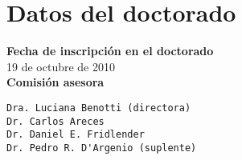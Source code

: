 \section{Datos del doctorado}
\label{datos}

{\bf Fecha de inscripci\'on en el doctorado}\\

19 de octubre de 2010\\

{\bf Comisi\'on asesora}

\begin{verbatim}
Dra. Luciana Benotti (directora)
Dr. Carlos Areces
Dr. Daniel E. Fridlender
Dr. Pedro R. D'Argenio (suplente)
\end{verbatim}


